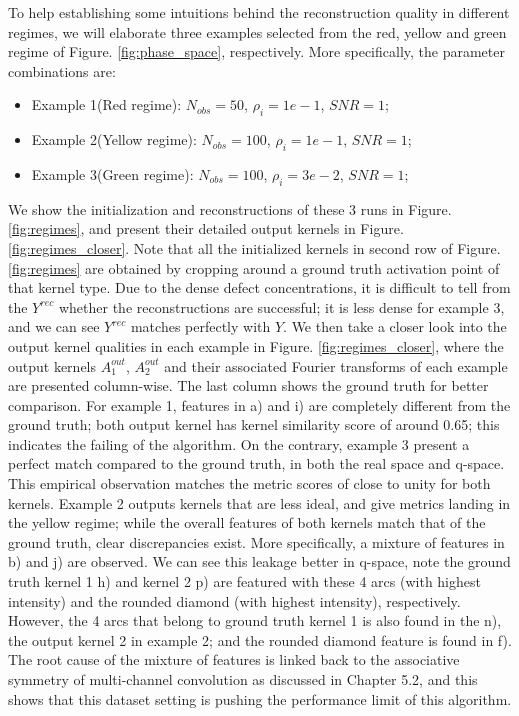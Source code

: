 To help establishing some intuitions behind the reconstruction quality in different regimes, we will elaborate three examples selected from the red, yellow and green regime of Figure. \ref{fig:phase_space}, respectively. More specifically, the parameter combinations are: 
\begin{itemize}
	\item Example 1(Red regime): $N_{obs} = 50$, $\rho_i = 1e-1$, $SNR = 1$;
	\item Example 2(Yellow regime): $N_{obs} = 100$, $\rho_i = 1e-1$, $SNR = 1$;
	\item Example 3(Green regime): $N_{obs} = 100$, $\rho_i = 3e-2$, $SNR = 1$;
\end{itemize}

We show the initialization and reconstructions of these 3 runs in Figure. \ref{fig:regimes}, and present their detailed output kernels in Figure. \ref{fig:regimes_closer}. Note that all the initialized kernels in second row of Figure. \ref{fig:regimes} are obtained by cropping around a ground truth activation point of that kernel type. Due to the dense defect concentrations, it is difficult to tell from the $Y^{rec}$ whether the reconstructions are successful; it is less dense for example 3, and we can see $Y^{rec}$ matches perfectly with $Y$. We then take a closer look into the output kernel qualities in each example in Figure. \ref{fig:regimes_closer}, where the output kernels $A_1^{out}$, $A_2^{out}$ and their associated Fourier transforms of each example are presented column-wise. The last column shows the ground truth for better comparison. For example 1, features in a) and i) are completely different from the ground truth; both output kernel has kernel similarity score of around 0.65; this indicates the failing of the algorithm. On the contrary, example 3 present a perfect match compared to the ground truth, in both the real space and q-space. This empirical observation matches the metric scores of close to unity for both kernels. Example 2 outputs kernels that are less ideal, and give metrics landing in the yellow regime; while the overall features of both kernels match that of the ground truth, clear discrepancies exist. More specifically, a mixture of features in b) and j) are observed. We can see this leakage better in q-space, note the ground truth kernel 1 h) and kernel 2 p) are featured with these 4 arcs (with highest intensity) and the rounded diamond (with highest intensity), respectively. However, the 4 arcs that belong to ground truth kernel 1 is also found in the n), the output kernel 2 in example 2; and the rounded diamond feature is found in f). The root cause of the mixture of features is linked back to the associative symmetry of multi-channel convolution as discussed in Chapter 5.2, and this shows that this dataset setting is pushing the performance limit of this algorithm.

